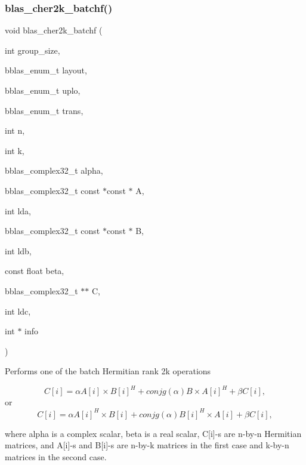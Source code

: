 \subsubsection{\texorpdfstring{blas\+\_\+cher2k\+\_\+batchf()}{blas\_cher2k\_batchf()}}
{\footnotesize\ttfamily void blas\+\_\+cher2k\+\_\+batchf (\begin{DoxyParamCaption}\item[{int}]{group\+\_\+size,  }\item[{bblas\+\_\+enum\+\_\+t}]{layout,  }\item[{bblas\+\_\+enum\+\_\+t}]{uplo,  }\item[{bblas\+\_\+enum\+\_\+t}]{trans,  }\item[{int}]{n,  }\item[{int}]{k,  }\item[{bblas\+\_\+complex32\+\_\+t}]{alpha,  }\item[{bblas\+\_\+complex32\+\_\+t const $\ast$const $\ast$}]{A,  }\item[{int}]{lda,  }\item[{bblas\+\_\+complex32\+\_\+t const $\ast$const $\ast$}]{B,  }\item[{int}]{ldb,  }\item[{const float}]{beta,  }\item[{bblas\+\_\+complex32\+\_\+t $\ast$$\ast$}]{C,  }\item[{int}]{ldc,  }\item[{int $\ast$}]{info }\end{DoxyParamCaption})}

Performs one of the batch Hermitian rank 2k operations

\[ C[i] = \alpha A[i] \times B[i]^H + conjg( \alpha ) B \times A[i]^H + \beta C[i], \] or \[ C[i] = \alpha A[i]^H \times B[i] + conjg( \alpha ) B[i]^H \times A[i] + \beta C[i], \]

where alpha is a complex scalar, beta is a real scalar, C\mbox{[}i\mbox{]}-\/s are n-\/by-\/n Hermitian matrices, and A\mbox{[}i\mbox{]}-\/s and B\mbox{[}i\mbox{]}-\/s are n-\/by-\/k matrices in the first case and k-\/by-\/n matrices in the second case.


